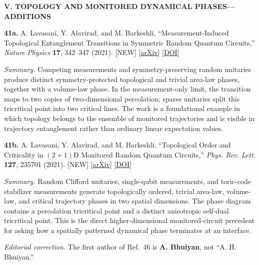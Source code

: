 \documentclass[aps,prb,onecolumn,nofootinbib]{revtex4-2}
\begin{document}
\thispagestyle{empty}
\begin{center}
{\large\bfseries V. TOPOLOGY AND MONITORED DYNAMICAL PHASES---ADDITIONS}
\end{center}

\noindent\textbf{41a.} A. Lavasani, Y. Alavirad, and M. Barkeshli,
``Measurement-Induced Topological Entanglement Transitions in Symmetric Random
Quantum Circuits,'' \textit{Nature Physics} \textbf{17}, 342--347 (2021).
[NEW] [\href{https://arxiv.org/abs/2004.07243}{arXiv}]
[\href{https://doi.org/10.1038/s41567-020-01112-z}{DOI}]

\smallskip
\noindent\textit{Summary.} Competing measurements and symmetry-preserving
random unitaries produce distinct symmetry-protected topological and trivial
area-law phases, together with a volume-law phase. In the measurement-only
limit, the transition maps to two copies of two-dimensional percolation; sparse
unitaries split this tricritical point into two critical lines. The work is a
foundational example in which topology belongs to the ensemble of monitored
trajectories and is visible in trajectory entanglement rather than ordinary
linear expectation values.

\medskip
\noindent\textbf{41b.} A. Lavasani, Y. Alavirad, and M. Barkeshli,
``Topological Order and Criticality in $(2+1)$D Monitored Random Quantum
Circuits,'' \textit{Phys. Rev. Lett.} \textbf{127}, 235701 (2021).
[NEW] [\href{https://arxiv.org/abs/2011.06595}{arXiv}]
[\href{https://doi.org/10.1103/PhysRevLett.127.235701}{DOI}]

\smallskip
\noindent\textit{Summary.} Random Clifford unitaries, single-qubit
measurements, and toric-code stabilizer measurements generate topologically
ordered, trivial area-law, volume-law, and critical trajectory phases in two
spatial dimensions. The phase diagram contains a percolation tricritical point
and a distinct anisotropic self-dual tricritical point. This is the direct
higher-dimensional monitored-circuit precedent for asking how a spatially
patterned dynamical phase terminates at an interface.

\vfill
\noindent\textit{Editorial correction.} The first author of Ref.~46 is
\textbf{A. Bhuiyan}, not ``A. H. Bhuiyan.''
\end{document}
